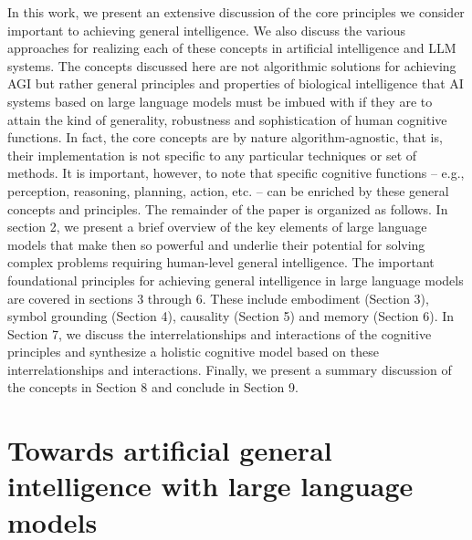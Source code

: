 \documentclass[10pt,journal,compsoc]{IEEEtran}
\begin{document}
	In this work, we present an extensive discussion of the core principles we consider important to achieving general intelligence. We also discuss the various approaches for realizing each of these concepts in artificial intelligence and LLM systems. The concepts discussed here are not algorithmic solutions for achieving AGI but rather general principles and properties of biological intelligence that AI systems based on large language models must be imbued with if they are to attain the kind of generality, robustness and sophistication of human cognitive functions. In fact, the core concepts are by nature algorithm-agnostic, that is, their implementation is not specific to any particular techniques or set of methods. It is important, however, to note that specific cognitive functions – e.g., perception, reasoning, planning, action, etc. – can be enriched by these general concepts and principles.  
	The remainder of the paper is organized as follows. In section 2, we present a brief overview of the key elements of large language models that make then so powerful and underlie their potential for solving complex problems requiring human-level general intelligence.  The important foundational principles for achieving general intelligence in large language models are covered in sections 3 through 6. These include embodiment (Section 3), symbol grounding (Section 4), causality (Section 5) and memory (Section 6).  In Section 7, we discuss the interrelationships and interactions of the cognitive principles and synthesize a holistic cognitive model based on these interrelationships and interactions.  Finally, we present a summary discussion of the concepts in Section 8 and conclude in Section 9.
	
	
	\section{Towards artificial general intelligence with large language models}
\end{document}
